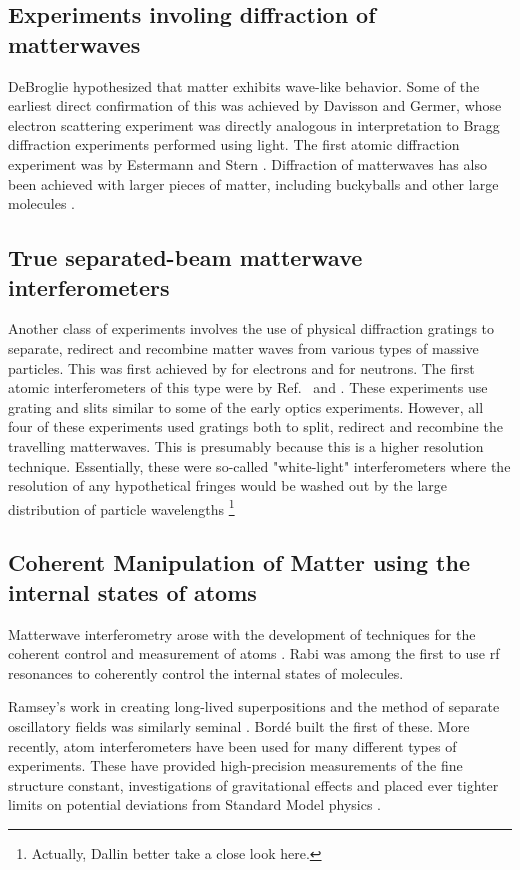\subsection{Experiments involing diffraction of matterwaves}
DeBroglie hypothesized that matter exhibits wave-like behavior. Some of the earliest direct confirmation of this was achieved by Davisson and Germer\cite{davisson_and_germer}, whose electron scattering experiment was directly analogous in interpretation to Bragg diffraction experiments performed using light. The first atomic diffraction experiment was by Estermann and Stern \cite{esterman_stern}\cite{Kronin_RMP}. Diffraction of matterwaves has also been achieved with larger pieces of matter, including buckyballs\cite{C60_interferometry} and other large molecules \cite{large_molecule_interferometry}.

\subsection{True separated-beam matterwave interferometers}
Another class of experiments involves the use of physical diffraction gratings to separate, redirect and recombine matter waves from various types of massive particles. This was first achieved by \cite{electronGrating} for electrons and \cite{neutronGrating} for neutrons. The first atomic interferometers of this type were by Ref.~\cite{pritchard1991} and \cite{youngDoubleSlit_Carnal_Mlynek}. These experiments use grating and slits similar to some of the early optics experiments. However, all four of these experiments used gratings both to split, redirect and recombine the travelling matterwaves. This is presumably because this is a higher resolution technique. Essentially, these were so-called "white-light" interferometers where the resolution of any hypothetical fringes would be washed out by the large distribution of particle wavelengths \footnote{Actually, Dallin better take a close look here.} 


\subsection{Coherent Manipulation of Matter using the internal states of atoms}
Matterwave interferometry arose with the development of techniques for the coherent control and measurement of atoms \cite{Kronin_RMP}. Rabi was among the first to use rf resonances to coherently control the internal states of molecules\cite{RabiOriginal}\cite{Kronin_RMP}. 

Ramsey's work in creating long-lived superpositions and the method of separate oscillatory fields was similarly seminal \cite{Kronin_RMP}\cite{Ramsey_original}. 
Bord\'e built \cite{borde_interferometer} the first of these. 
More recently, atom interferometers have been used for many different types of experiments. These have provided high-precision measurements of the fine structure constant, investigations of gravitational effects and placed ever tighter limits on potential deviations from Standard Model physics \cite{Kronin_RMP}.

